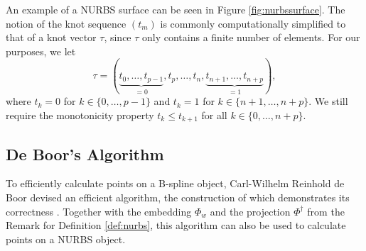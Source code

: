 \documentclass[a4paper, 11pt]{report}
\theoremstyle{definition}
\begin{document}
	An example of a NURBS surface can be seen in Figure \ref{fig:nurbssurface}. The notion of the knot sequence $(t_m)$ is commonly computationally simplified to that of a knot vector $\tau$, since $\tau$ only contains a finite number of elements. For our purposes, we let
		$$\tau = (\underbrace {t_0, \ldots, t_{p-1}}_{= 0}, t_p, \ldots, t_n, \underbrace{t_{n+1}, \ldots, t_{n+p}}_{= 1}),$$
	where $t_k = 0$ for $k \in \{0,\ldots,p-1\}$ and $t_k = 1$ for $k \in \{n+1, \ldots, n+p\}$. We still require the monotonicity property $t_k \leq t_{k+1}$ for all $k \in \{0, \ldots, n+p\}$.

\subsection{De Boor's Algorithm}
	To efficiently calculate points on a B-spline object, Carl-Wilhelm Reinhold de Boor devised an efficient algorithm, the construction of which demonstrates its correctness \cite{Boor1971}. Together with the embedding $\Phi_w$ and the projection $\Phi^\dagger$ from the Remark for Definition \ref{def:nurbs}, this algorithm can also be used to calculate points on a NURBS object.
\end{document}

